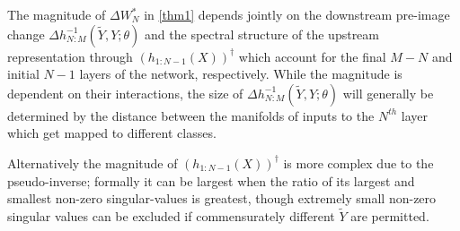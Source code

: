 \documentclass{article}
\theoremstyle{plain}
\theoremstyle{definition}
\theoremstyle{remark}
\begin{document}
The magnitude of $\Delta W_N^\ast$ in \eqref{thm1} depends jointly on the downstream pre-image change
$\Delta h_{N:M}^{-1}(\tilde Y, Y;\theta)$ and the spectral structure of the upstream representation through
$(h_{1:N-1}(X))^\dagger$ which account for the final $M-N$ and initial $N-1$ layers of the network, respectively. While the magnitude is dependent on their interactions, the size of $\Delta h_{N:M}^{-1}(\tilde{Y},Y;\theta)$ will generally be determined by the distance between the manifolds of inputs to the $N^{th}$ layer which get mapped to different classes.

Alternatively the magnitude of $(h_{1:N-1}(X))^{\dagger}$ is more complex due to the pseudo-inverse; formally it can be largest when the ratio of its largest and smallest non-zero singular-values is greatest, though extremely small non-zero singular values can be excluded if commensurately different $\tilde{Y}$ are permitted.


\end{document}

